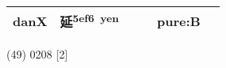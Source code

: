 \documentclass[14pt,a4paper]{scrartcl}
\begin{document}
\begin{longtable}[c]{@{}llllll@{}}
\begin{minipage}[t]{0.14\columnwidth}
danX
\strut\end{minipage} &
\begin{minipage}[t]{0.14\columnwidth}\raggedright\strut
延\textsuperscript{5ef6~yen}
\strut\end{minipage} &
\begin{minipage}[t]{0.14\columnwidth}\raggedright\strut
\strut\end{minipage} &
\begin{minipage}[t]{0.14\columnwidth}\raggedright\strut
\strut\end{minipage} &
\begin{minipage}[t]{0.14\columnwidth}\raggedright\strut
pure:B
\strut\end{minipage}\tabularnewline
\bottomrule
\end{longtable}

(49) 0208 {[}2{]}
\end{document}
